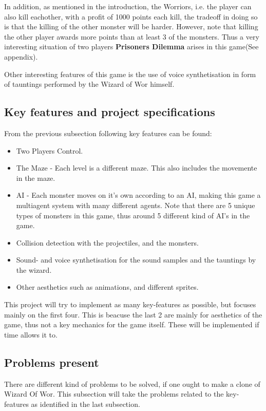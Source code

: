 \documentclass{article}
\begin{document}
  In addition, as mentioned in the introduction, the Worriors, i.e. the player can also kill eachother, with a profit of 1000 points each kill, the tradeoff in doing so is that the killing of the other monster will be harder. However, note that killing the other player awards more points than at least 3 of the monsters. Thus a very interesting situation of two players \textbf{Prisoners Dilemma} arises in this game(See appendix).

  Other interesting features of this game is the use of voice synthetisation in form of tauntings performed by the Wizard of Wor himself.

  \subsection{Key features and project specifications}
  From the previous subsection following key features can be found:
  \begin{itemize}
    \item Two Players Control.
    \item The Maze - Each level is a different maze. This also includes the movemente in the maze.
    \item AI - Each monster moves on it's own according to an AI, making this game a multiagent system with many different agents. Note that there are 5 unique types of monsters in this game, thus around 5 different kind of AI's in the game.
    \item Collision detection with the projectiles, and the monsters.
    \item Sound- and voice synthetisation for the sound samples and the tauntings by the wizard.
    \item Other aesthetics such as animations, and different sprites.
  \end{itemize}
  This project will try to implement as many key-features as possible, but focuses mainly on the first four. This is beacuse the last 2 are mainly for aesthetics of the game, thus not a key mechanics for the game itself. These will be implemented if time allows it to.

  \subsection{Problems present}
  There are different kind of problems to be solved, if one ought to make a clone of Wizard Of Wor. This subsection will take the problems related to the key-features as identified in the last subsection.
\end{document}
